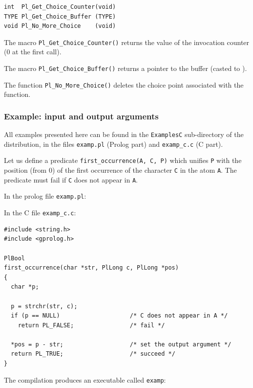 \begin{Code}
\begin{verbatim}
int  Pl_Get_Choice_Counter(void)
TYPE Pl_Get_Choice_Buffer (TYPE)
void Pl_No_More_Choice    (void)
\end{verbatim}
\end{Code}

The macro \texttt{Pl\_Get\_Choice\_Counter()} returns the value of the
invocation counter (0 at the first call).

The macro \texttt{Pl\_Get\_Choice\_Buffer()} returns a
pointer to the buffer (casted to ).

The function \texttt{Pl\_No\_More\_Choice()} deletes the choice point
associated with the function.

\subsubsection{Example: input and output arguments}
All examples presented here can be found in the \texttt{ExamplesC}
sub-directory of the distribution, in the files \texttt{examp.pl} (Prolog
part) and \texttt{examp\_c.c} (C part).

Let us define a predicate \texttt{first\_occurrence(A, C, P)} which unifies
\texttt{P} with the position (from 0) of the first occurrence of the
character \texttt{C} in the atom \texttt{A}. The predicate must fail if
\texttt{C} does not appear in \texttt{A}.

In the prolog file \texttt{examp.pl}:


In the C file \texttt{examp\_c.c}:

\begin{Code}
\begin{verbatim}
#include <string.h>
#include <gprolog.h>

PlBool
first_occurrence(char *str, PlLong c, PlLong *pos)
{
  char *p;

  p = strchr(str, c);
  if (p == NULL)                    /* C does not appear in A */
    return PL_FALSE;                /* fail */

  *pos = p - str;                   /* set the output argument */
  return PL_TRUE;                   /* succeed */
}
\end{verbatim}
\end{Code}

The compilation produces an executable called \texttt{examp}:

